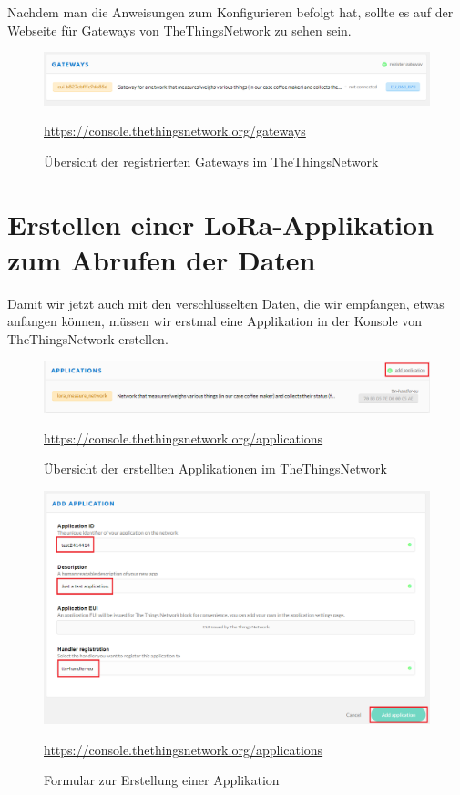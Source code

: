 Nachdem man die Anweisungen zum Konfigurieren befolgt hat, sollte es auf der Webseite für Gateways von TheThingsNetwork zu sehen sein.
\begin{figure}[ht]
    \center
    \includegraphics[width=16cm]{Bilder/lora-1.png}\\
    \caption{Übersicht der registrierten Gateways im TheThingsNetwork}
    \begin{center} \quelle\url{https://console.thethingsnetwork.org/gateways} \end{center}
\end{figure}
\newpage
\section{Erstellen einer LoRa-Applikation zum Abrufen der Daten}
Damit wir jetzt auch mit den verschlüsselten Daten, die wir empfangen, etwas anfangen können, müssen wir erstmal eine Applikation in der Konsole von TheThingsNetwork erstellen. 
\begin{figure}[ht]
    \center
    \includegraphics[width=16cm]{Bilder/lora-2.png}\\
    \caption{Übersicht der erstellten Applikationen im TheThingsNetwork}
    \begin{center} \quelle\url{https://console.thethingsnetwork.org/applications} \end{center}
\end{figure}
\begin{figure}[ht]
    \center
    \includegraphics[width=16cm]{Bilder/lora-3.png}\\
    \caption{Formular zur Erstellung einer Applikation}
    \begin{center} \quelle\url{https://console.thethingsnetwork.org/applications} \end{center}
\end{figure}
\newpage
